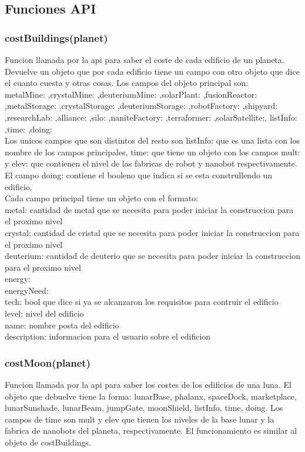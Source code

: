 \documentclass{article}
\newcommand\tab[1][1cm]{\hspace*{#1}}
\begin{document}
    \subsection{Funciones API}
        \subsubsection{costBuildings(planet)}
          Funcion llamada por la api para saber el coste de cada edificio de un planeta. Devuelve un objeto que por cada edificio tiene un campo con otro objeto que dice el cuanto cuesta y otras cosas. Los campos del objeto principal son:\\
          metalMine: ,crystalMine: ,deuteriumMine: ,solarPlant: ,fusionReactor: ,metalStorage: ,crystalStorage: ,deuteriumStorage: ,robotFactory: ,shipyard: ,researchLab: ,alliance: ,silo: ,naniteFactory: ,terraformer: ,solarSatellite:, listInfo: ,time: ,doing:\\
          Los unicos campos que son distintos del resto son listInfo: que es una lista con los nombre de los campos principales, time: que tiene un objeto con los campos mult: y elev: que contienen el nivel de las fabricas de robot y nanobot respectivamente. El campo doing: contiene el booleno que indica si se esta construllendo un edificio.\\
          Cada campo principal tiene un objeto con el formato:\\
          \tab metal: cantidad de metal que se necesita para poder iniciar la construccion para el proximo nivel\\
          \tab crystal: cantidad de cristal que se necesita para poder iniciar la construccion para el proximo nivel\\
          \tab deuterium: cantidad de deuterio que se necesita para poder iniciar la construccion para el proximo nivel\\
          \tab energy: \\
          \tab energyNeed: \\
          \tab tech: bool que dice si ya se alcanzaron los requisitos para contruir el edificio\\
          \tab level: nivel del edificio\\
          \tab name: nombre posta del edificio\\
          \tab description: informacion para el usuario sobre el edificion\\
        \subsubsection{costMoon(planet)}
            Funcion llamada por la api para saber los costes de los edificios de una luna. El objeto que debuelve tiene la forma: lunarBase, phalanx, spaceDock, marketplace, lunarSunshade, lunarBeam, jumpGate, moonShield, listInfo, time, doing. Los campos de time son mult y elev que tienen los niveles de la base lunar y la fabrica de nanobots del planeta, respectivamente. El funcionamiento es similar al objeto de costBuildings.
\end{document}
